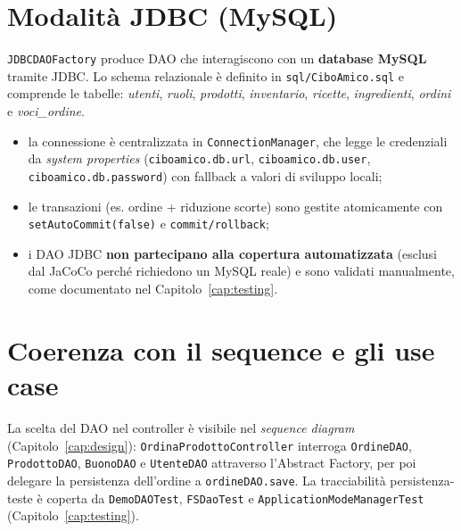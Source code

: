 \section{Modalità JDBC (MySQL)}
\texttt{JDBCDAOFactory} produce DAO che interagiscono con un \textbf{database
MySQL} tramite JDBC. Lo schema relazionale è definito in
\texttt{sql/CiboAmico.sql} e comprende le tabelle:
\emph{utenti}, \emph{ruoli}, \emph{prodotti}, \emph{inventario},
\emph{ricette}, \emph{ingredienti}, \emph{ordini} e \emph{voci\_ordine}.

\begin{itemize}
    \item la connessione è centralizzata in \texttt{ConnectionManager}, che
    legge le credenziali da \emph{system properties}
    (\texttt{ciboamico.db.url}, \texttt{ciboamico.db.user},
    \texttt{ciboamico.db.password}) con fallback a valori di sviluppo locali;
    \item le transazioni (es. ordine + riduzione scorte) sono gestite
    atomicamente con \texttt{setAutoCommit(false)} e \texttt{commit/rollback};
    \item i DAO JDBC \textbf{non partecipano alla copertura automatizzata}
    (esclusi dal JaCoCo perché richiedono un MySQL reale) e sono validati
    manualmente, come documentato nel Capitolo~\ref{cap:testing}.
\end{itemize}

\section{Coerenza con il sequence e gli use case}
La scelta del DAO nel controller è visibile nel \emph{sequence diagram}
(Capitolo~\ref{cap:design}): \texttt{OrdinaProdottoController} interroga
\texttt{OrdineDAO}, \texttt{ProdottoDAO}, \texttt{BuonoDAO} e
\texttt{UtenteDAO} attraverso l'Abstract Factory, per poi delegare la
persistenza dell'ordine a \texttt{ordineDAO.save}. La tracciabilità
persistenza-teste è coperta da \texttt{DemoDAOTest}, \texttt{FSDaoTest} e
\texttt{ApplicationModeManagerTest} (Capitolo~\ref{cap:testing}).